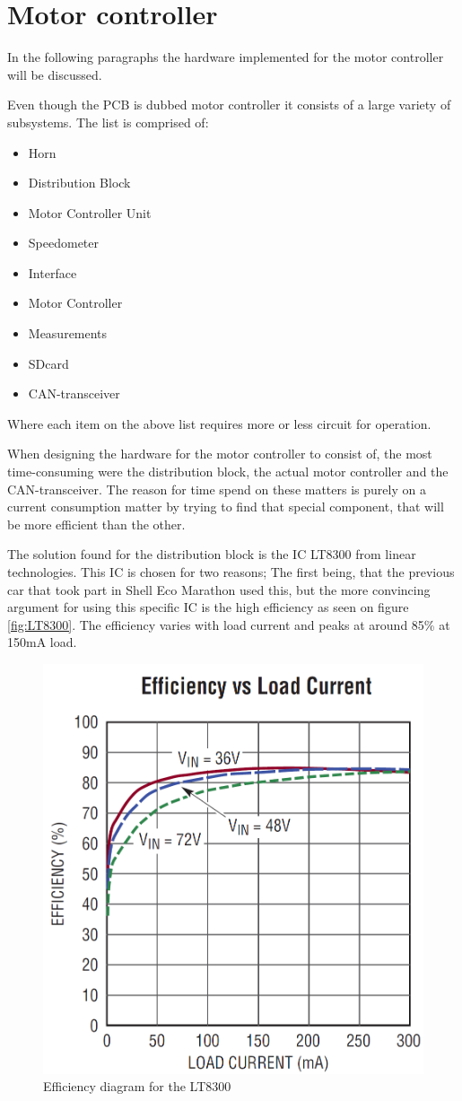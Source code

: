 \section{Motor controller}
In the following paragraphs the hardware implemented for the motor controller will be discussed. 

Even though the PCB is dubbed motor controller it consists of a large variety of subsystems. The list is comprised of: 

\begin{itemize}
	\item{Horn}
	\item{Distribution Block}
	\item{Motor Controller Unit}
	\item{Speedometer}
	\item{Interface}
	\item{Motor Controller}
	\item{Measurements}
	\item{SDcard}
	\item{CAN-transceiver}
\end{itemize}

Where each item on the above list requires more or less circuit for operation. 

When designing the hardware for the motor controller to consist of, the most time-consuming were the distribution block, the actual motor controller and the CAN-transceiver. The reason for time spend on these matters is purely on a current consumption matter by trying to find that special component, that will be more efficient than the other. 

The solution found for the distribution block is the IC LT8300\cite{LT8300} from linear technologies. This IC is chosen for two reasons; The first being, that the previous car that took part in Shell Eco Marathon used this, but the more convincing argument for using this specific IC is the high efficiency as seen on figure \vref{fig:LT8300}. The efficiency varies with load current and peaks at around 85\% at 150mA load.  

\begin{figure}[H]
	\centering
	\includegraphics[width=0.5\linewidth]{Hardware/Pictures/LT8300}
	\caption{Efficiency diagram for the LT8300}
	\label{fig:LT8300}
\end{figure}

